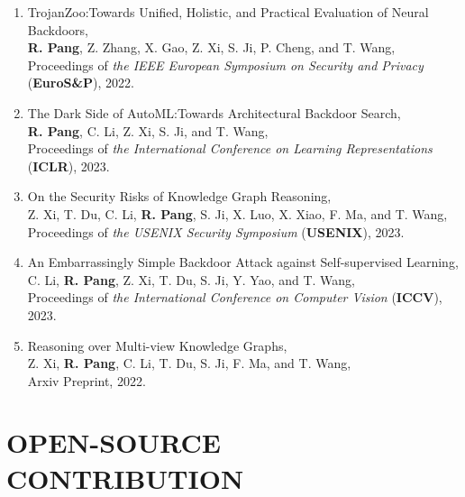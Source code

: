 \documentclass[letterpaper,11pt]{article}
\begin{document}
\begin{enumerate}[labelsep=15pt, parsep=-4pt]
    \item TrojanZoo:\@ Towards Unified, Holistic, and Practical Evaluation of Neural Backdoors,\\
    \textbf{R. Pang}, Z. Zhang, X. Gao, Z. Xi, S. Ji, P. Cheng, and T. Wang,\\
    Proceedings of {\it the IEEE European Symposium on Security and Privacy\/} (\textbf{EuroS\&P}), 2022.
    
    \item The Dark Side of AutoML:\@ Towards Architectural Backdoor Search,\\
    \textbf{R. Pang}, C. Li, Z. Xi, S. Ji, and T. Wang,\\
    Proceedings of {\it the International Conference on Learning Representations\/} (\textbf{ICLR}), 2023.
    
    \item On the Security Risks of Knowledge Graph Reasoning,\\
    Z. Xi, T. Du, C. Li, \textbf{R. Pang}, S. Ji, X. Luo, X. Xiao, F. Ma, and T. Wang,\\
    Proceedings of {\it the USENIX Security Symposium\/} (\textbf{USENIX}), 2023.
    
    \item An Embarrassingly Simple Backdoor Attack against Self-supervised Learning,\\
    C. Li, \textbf{R. Pang}, Z. Xi, T. Du, S. Ji, Y. Yao, and T. Wang,\\
    Proceedings of {\it the International Conference on Computer Vision\/} (\textbf{ICCV}), 2023.

    \item Reasoning over Multi-view Knowledge Graphs,\\
    Z. Xi, \textbf{R. Pang}, C. Li, T. Du, S. Ji, F. Ma, and T. Wang,\\
    Arxiv Preprint, 2022.

    \end{enumerate}


\section{OPEN-SOURCE CONTRIBUTION}
\end{document}

